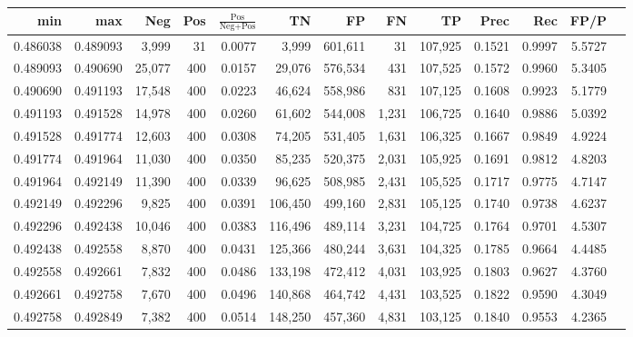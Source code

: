 \begin{tabular}{rrrrrrrrrrrrr}
\toprule
     min &      max &    Neg & Pos & $\frac{\text{Pos}}{\text{Neg}+\text{Pos}}$ &      TN &      FP &      FN &      TP &   Prec &    Rec &   FP/P \\
\midrule
0.486038 & 0.489093 &  3,999 &  31 &                                     0.0077 &   3,999 & 601,611 &      31 & 107,925 & 0.1521 & 0.9997 & 5.5727 \\
0.489093 & 0.490690 & 25,077 & 400 &                                     0.0157 &  29,076 & 576,534 &     431 & 107,525 & 0.1572 & 0.9960 & 5.3405 \\
0.490690 & 0.491193 & 17,548 & 400 &                                     0.0223 &  46,624 & 558,986 &     831 & 107,125 & 0.1608 & 0.9923 & 5.1779 \\
0.491193 & 0.491528 & 14,978 & 400 &                                     0.0260 &  61,602 & 544,008 &   1,231 & 106,725 & 0.1640 & 0.9886 & 5.0392 \\
0.491528 & 0.491774 & 12,603 & 400 &                                     0.0308 &  74,205 & 531,405 &   1,631 & 106,325 & 0.1667 & 0.9849 & 4.9224 \\
0.491774 & 0.491964 & 11,030 & 400 &                                     0.0350 &  85,235 & 520,375 &   2,031 & 105,925 & 0.1691 & 0.9812 & 4.8203 \\
0.491964 & 0.492149 & 11,390 & 400 &                                     0.0339 &  96,625 & 508,985 &   2,431 & 105,525 & 0.1717 & 0.9775 & 4.7147 \\
0.492149 & 0.492296 &  9,825 & 400 &                                     0.0391 & 106,450 & 499,160 &   2,831 & 105,125 & 0.1740 & 0.9738 & 4.6237 \\
0.492296 & 0.492438 & 10,046 & 400 &                                     0.0383 & 116,496 & 489,114 &   3,231 & 104,725 & 0.1764 & 0.9701 & 4.5307 \\
0.492438 & 0.492558 &  8,870 & 400 &                                     0.0431 & 125,366 & 480,244 &   3,631 & 104,325 & 0.1785 & 0.9664 & 4.4485 \\
0.492558 & 0.492661 &  7,832 & 400 &                                     0.0486 & 133,198 & 472,412 &   4,031 & 103,925 & 0.1803 & 0.9627 & 4.3760 \\
0.492661 & 0.492758 &  7,670 & 400 &                                     0.0496 & 140,868 & 464,742 &   4,431 & 103,525 & 0.1822 & 0.9590 & 4.3049 \\
0.492758 & 0.492849 &  7,382 & 400 &                                     0.0514 & 148,250 & 457,360 &   4,831 & 103,125 & 0.1840 & 0.9553 & 4.2365 \\

\end{tabular}
